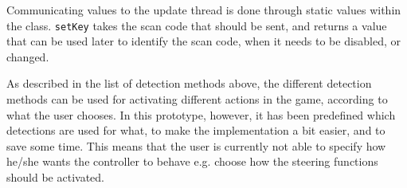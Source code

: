 Communicating values to the update thread is done through static values within the class. 
\texttt{setKey} takes the scan code that should be sent, and returns a value that can be used later to identify the scan code, when it needs to be disabled, or changed.
\bigskip

As described in the list of detection methods above, the different detection methods can be used for activating different actions in the game, according to what the user chooses. 
In this prototype, however, it has been predefined which detections are used for what, to make the implementation a bit easier, and to save some time. 
This means that the user is currently not able to specify how he/she wants the controller to behave e.g. choose how the steering functions should be activated.